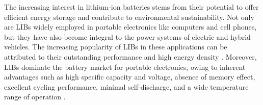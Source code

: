 The increasing interest in lithium-ion batteries stems from their potential to offer efficient energy storage and contribute to environmental sustainability. Not only are LIBs widely employed in portable electronics like computers and cell phones, but they have also become integral to the power systems of electric and hybrid vehicles. The increasing popularity of LIBs in these applications can be attributed to their outstanding performance and high energy density \cite{kang2020binder}. Moreover, LIBs dominate the battery market for portable electronics, owing to inherent advantages such as high specific capacity and voltage, absence of memory effect, excellent cycling performance, minimal self-discharge, and a wide temperature range of operation \cite{zubi2018lithium}.

\vspace{5mm}

